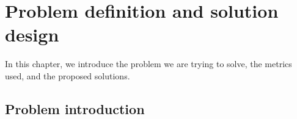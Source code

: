 \chapter{Problem definition and solution design}
\label{chap:prob}

In this chapter, we introduce the problem we are trying to solve, the metrics used, and the proposed solutions.

\section{Problem introduction}
\label{sec:Problem-intro}





